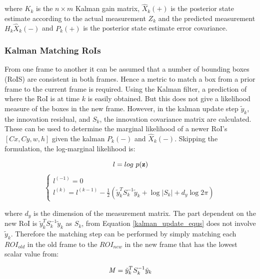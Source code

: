 \documentclass[11pt,twoside]{report}
\begin{document}
where $K_{k}$ is the $n \times m$ Kalman gain matrix, $\hat{X}_{k}(+)$ is the posterior state estimate according to the actual measurement $Z_{k}$ and the predicted measurement $H_{k} \hat{X}_{k}(-)$ and $P_{k}(+)$ is the posterior state estimate error covariance.

\subsubsection{Kalman Matching RoIs}

From one frame to another it can be assumed that a number of bounding boxes (RoIS) are consistent in both frames. Hence a metric to match a box from a prior frame to the current frame is required. Using the Kalman filter, a prediction of where the RoI is at time $k$ is easily obtained. But this does not give a likelihood measure of the boxes in the new frame. However, in the kalman update step $\tilde{y}_{k}$, the innovation residual, and $S_{k}$, the innovation covariance matrix are calculated. These can be used to determine the marginal likelihood of a newer RoI's $[Cx,Cy,w,h]$ given the kalman $P_{k}(-)$ and $\hat{X}_{k}(-)$. Skipping the formulation, the log-marginal likelihood is:

\begin{equation}
l = log \textnormal{ } p(\mathbf{z})
\end{equation}
\begin{equation}
\begin{cases}
l^{(-1)} = 0 \\
l^{(k)} = l^{(k-1)} - \frac{1}{2} (\tilde{y}_{k}^{T}S_{k}^{-1}\tilde{y}_{k} + \log |S_{k}| + d_{y}\log 2 \pi) 
\end{cases}
\end{equation}

where $d_{y}$ is the dimension of the measurement matrix. The part dependent on the new RoI is $\tilde{y}_{k}^{T}S_{k}^{-1}\tilde{y}_{k}$ as $S_{k}$, from Equation \ref{kalman_update_equs} does not involve $\tilde{y}_{k}$. Therefore the matching step can be performed by simply matching each $ROI_{old}$ in the old frame to the $ROI_{new}$ in the new frame that has the lowest scalar value from:

\begin{equation}
\begin{aligned}
\textnormal{\textit{M}} = \tilde{y}_{k}^{T}S_{k}^{-1}\tilde{y}_{k}
\end{aligned}
\end{equation}
\end{document}

